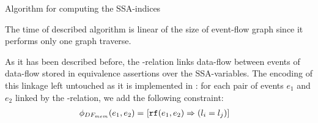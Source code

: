 \begin{algorithm}
    \caption{Algorithm for computing the SSA-indices}\label{alg:compute-ssa}
    \begin{algorithmic}[1]
                         
                        \EndIf
                    \EndFor
                \EndFor
            \EndFor
        \EndFunction
    \end{algorithmic}
    \label{algorithm:ssa-map}
\end{algorithm}

The time of described algorithm is linear of the size of event-flow graph since it performs only one graph traverse.

As it has been described before, the \rf-relation links data-flow between events %
of data-flow stored in equivalence assertions over the SSA-variables. 
The encoding of this linkage left untouched as it is implemented in \porthos: for each pair of events $e_1$ and $e_2$ linked by the \rf-relation, we add the following constraint:
%
\begin{align}
\phi_{DF_{mem}}(e_1, e_2) = \ & [\texttt{rf}(e_1, e_2) \Rightarrow (l_i = l_j)]
\end{align}

